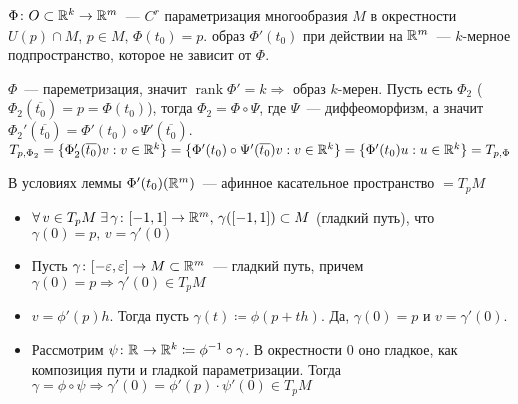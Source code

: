 
\begin{Lemma*}
    $\Phi\colon O\subset\rmy[k]\to\rmy$~--- $C^r$ параметризация многообразия $M$ в окрестности $U(p)\cap M$, $p\in M,\,\Phi(t_0)=p$. \THEN образ $\Phi'(t_0)$ при действии на $\rmy$~--- $k$-мерное подпространство, которое не зависит от $\Phi$.
\end{Lemma*}

\begin{Proof}
    $\Phi$~--- пареметризация, значит $\operatorname{rank}\Phi'=k\Rightarrow$ образ $k$-мерен. Пусть есть $\Phi_2$ ($\Phi_2(\overline{t_0})=p=\Phi(t_0)$), тогда $\Phi_2=\Phi\circ\Psi$, где $\Psi$~--- диффеоморфизм, а значит $\Phi_2'(\overline{t_0})=\Phi'(t_0)\circ\Psi'(\overline{t_0})$.\\ $T_{p,\Phi_2}=\{\Phi_2'(\overline{t_0})v:v\in\rmy[k]\}=\{\Phi'(t_0)\circ\Psi'(\overline{t_0})v:v\in\rmy[k]\}=\{\Phi'(t_0)u:u\in\rmy[k]\}=T_{p,\Phi}$
\end{Proof}

\begin{defin*}
    В условиях леммы $\Phi'(t_0)(\rmy[m])$~--- афинное касательное пространство $=T_p M$
\end{defin*}

{
\newcommand{\tpm}{T_p M}
\begin{NB*}\leavevmode
    \begin{itemize}
        \item $\forall\,v\in\tpm\;\exists\,\gamma\colon[-1,1]\to\rmy,\,\gamma([-1,1])\subset M$ (гладкий путь), что $\gamma(0)=p,\,v=\gamma'(0)$
        \item Пусть $\gamma\colon[-\varepsilon,\varepsilon]\to M\subset\rmy$~--- гладкий путь, причем $\gamma(0)=p\Rightarrow \gamma'(0)\in\tpm$
    \end{itemize}
\end{NB*}

\begin{Proof}\leavevmode
    \begin{itemize}
        \item $v=\phi'(p)h$. Тогда пусть $\gamma(t)\coloneqq\phi(p+t h)$. Да, $\gamma(0)=p$ и $v=\gamma'(0)$.
        \item Рассмотрим $\psi\colon\rmy[]\to\rmy[k]\coloneqq\phi^{-1}\circ\gamma$. В окрестности $0$ оно гладкое, как композиция пути и гладкой параметризации. Тогда $\gamma=\phi\circ\psi\Rightarrow\gamma'(0)=\phi'(p)\cdot\psi'(0)\in\tpm$
    \end{itemize}
\end{Proof}
}

